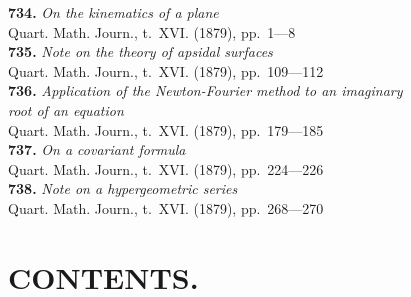 \documentclass[11pt,a4paper]{book}
\begin{document}
\textbf{734.} \textit{On the kinematics of a plane} \\
\hspace*{2em}Quart. Math. Journ., t.~XVI. (1879), pp.~1---8\\[0.3em]
\textbf{735.} \textit{Note on the theory of apsidal surfaces} \\
\hspace*{2em}Quart. Math. Journ., t.~XVI. (1879), pp.~109---112\\[0.3em]
\textbf{736.} \textit{Application of the Newton-Fourier method to an imaginary}\\
\hspace*{2em}\textit{root of an equation} \\
\hspace*{2em}Quart. Math. Journ., t.~XVI. (1879), pp.~179---185\\[0.3em]
\textbf{737.} \textit{On a covariant formula} \\
\hspace*{2em}Quart. Math. Journ., t.~XVI. (1879), pp.~224---226\\[0.3em]
\textbf{738.} \textit{Note on a hypergeometric series} \\
\hspace*{2em}Quart. Math. Journ., t.~XVI. (1879), pp.~268---270

\cleardoublepage

\chapter*{CONTENTS.}
\end{document}
